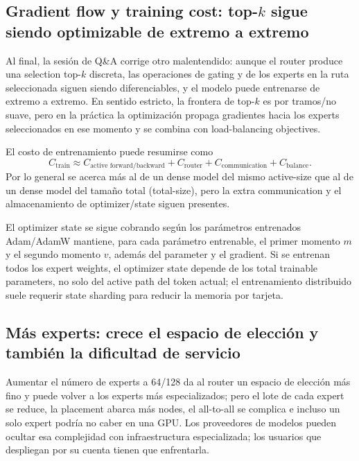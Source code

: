 \documentclass[a4paper]{article}
\begin{document}
\subsection{Gradient flow y training cost: \texorpdfstring{top-$k$}{top-k} sigue siendo optimizable de extremo a extremo}

Al final, la sesión de Q\&A corrige otro malentendido: aunque el router produce una selection top-$k$ discreta, las operaciones de gating y de los experts en la ruta seleccionada siguen siendo diferenciables, y el modelo puede entrenarse de extremo a extremo. En sentido estricto, la frontera de top-$k$ es por tramos/no suave, pero en la práctica la optimización propaga gradientes hacia los experts seleccionados en ese momento y se combina con load-balancing objectives.

El costo de entrenamiento puede resumirse como
\[
C_{\text{train}}\approx C_{\text{active forward/backward}}+C_{\text{router}}+C_{\text{communication}}+C_{\text{balance}}.
\]
Por lo general se acerca más al de un dense model del mismo active-size que al de un dense model del tamaño total (total-size), pero la extra communication y el almacenamiento de optimizer/state siguen presentes.

\begin{knowledgebox}{El optimizer state se sigue cobrando según los parámetros entrenados}
Adam/AdamW mantiene, para cada parámetro entrenable, el primer momento $m$ y el segundo momento $v$, además del parameter y el gradient. Si se entrenan todos los expert weights, el optimizer state depende de los total trainable parameters, no solo del active path del token actual; el entrenamiento distribuido suele requerir state sharding para reducir la memoria por tarjeta.
\end{knowledgebox}


\subsection{Más experts: crece el espacio de elección y también la dificultad de servicio}

Aumentar el número de experts a 64/128 da al router un espacio de elección más fino y puede volver a los experts más especializados; pero el lote de cada expert se reduce, la placement abarca más nodes, el all-to-all se complica e incluso un solo expert podría no caber en una GPU. Los proveedores de modelos pueden ocultar esa complejidad con infraestructura especializada; los usuarios que despliegan por su cuenta tienen que enfrentarla.
\end{document}
